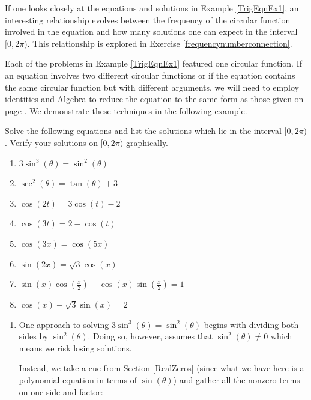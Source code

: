 \documentclass{ximera}
\begin{document}
If one looks closely at the equations and solutions in Example \ref{TrigEqnEx1}, an interesting relationship evolves between the frequency of the circular function involved in the equation and how many solutions one can expect in the interval $[0, 2\pi)$.   This relationship is explored in Exercise \ref{frequencynumberconnection}.

Each of the problems in Example \ref{TrigEqnEx1} featured one circular function.  If an equation involves two different circular functions or if the equation contains the same circular function but with different arguments, we will need to employ identities and Algebra to reduce the equation to the same form as those given on page  \pageref{trigeqnstrategy1}.  We demonstrate these techniques in the following example.
 
\begin{example} \label{TrigEqIdEx1}  Solve the following equations and list the solutions which lie in the interval $[0,2\pi)$.  Verify your solutions on $[0,2\pi)$ graphically.


\begin{enumerate}

\item  $3\sin^{3}(\theta) = \sin^{2}(\theta)$
\item $\sec^{2}(\theta) = \tan(\theta) + 3$

\item   $\cos(2t) = 3\cos(t) - 2$
\item  $\cos(3t) = 2- \cos(t)$
\item  $\cos(3x) = \cos(5x)$
\item $\sin(2x) =\sqrt{3} \cos(x)$
\item  $\sin(x)\cos\left(\frac{x}{2}\right) + \cos(x)\sin\left(\frac{x}{2}\right) = 1$
\item  $\cos(x) - \sqrt{3} \sin(x) = 2$
\end{enumerate}


\begin{explanation}
    

\begin{enumerate}

\item One approach to solving  $3\sin^{3}(\theta) = \sin^{2}(\theta)$ begins with dividing both sides by $\sin^{2}(\theta)$.  Doing so, however, assumes that $\sin^{2}(\theta) \neq 0$ which means we risk losing solutions.  

Instead, we take a cue from Section \ref{RealZeros} (since what we have here is a polynomial equation in terms of $\sin(\theta)$) and gather all the nonzero terms on one side and factor:
\[ \begin{array}{rclr}


\end{array}\]
\end{enumerate}
\end{explanation}
\end{example}
\end{document}
